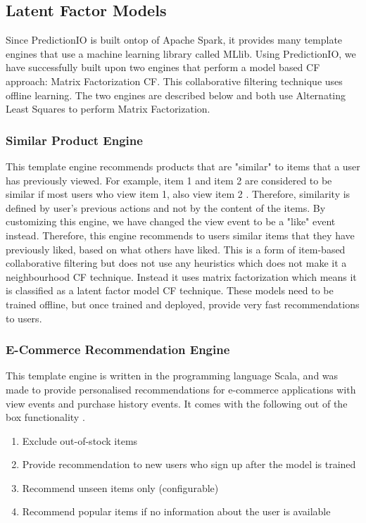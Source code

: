\subsection{Latent Factor Models}

Since PredictionIO \cite{predictionio} is built ontop of Apache Spark, it provides many template engines that use a machine learning library called MLlib. Using PredictionIO, we have successfully built upon two engines that perform a model based CF approach: Matrix Factorization CF. This collaborative filtering technique uses offline learning. The two engines are described below and both use Alternating Least Squares to perform Matrix Factorization.  

\subsubsection{Similar Product Engine}

This template engine recommends products that are "similar" to items that a user has previously viewed. For example, item 1 and item 2 are considered to be similar if most users who view item 1, also view item 2 \cite{predictionio}. Therefore, similarity is defined by user's previous actions and not by the content of the items. 
By customizing this engine, we have changed the view event to be a "like" event instead. Therefore, this engine recommends to users similar items that they have previously liked, based on what others have liked. This is a form of item-based collaborative filtering but does not use any heuristics which does not make it a neighbourhood CF technique. Instead it uses matrix factorization which means it is classified as a latent factor model CF technique. These models need to be trained offline, but once trained and deployed, provide very fast recommendations to users. 

\subsubsection{E-Commerce Recommendation Engine}

This template engine is written in the programming language Scala, and was made to provide personalised recommendations for e-commerce applications with view events and purchase history events. It comes with the following out of the box functionality \cite{predictionio}.
\begin{enumerate}
 \item Exclude out-of-stock items
 \item Provide recommendation to new users who sign up after the model is trained
 \item Recommend unseen items only (configurable)
 \item Recommend popular items if no information about the user is available
\end{enumerate}

